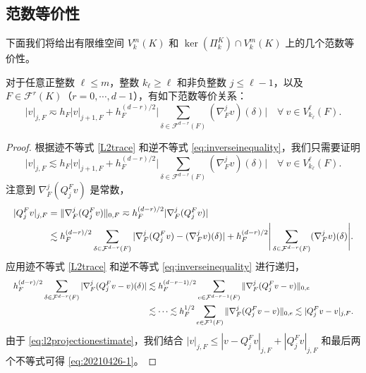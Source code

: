\subsection{范数等价性}
下面我们将给出有限维空间 
$V_{k}^{m}(K)$ 和 $\ker(\Pi_k^K)\cap V_{k}^{m}(K)$ 上的几个范数等价性。

\begin{lemma}
对于任意正整数 $\ell\leq m$，整数 $k_{\ell}\geq\ell$ 和非负整数 $j\leq \ell-1$，以及 $F\in\mathcal F^r(K)$（$r=0,\cdots, d-1$），有如下范数等价关系：
\begin{equation}\label{eq:normequivalencevertices}
|v|_{j,F}\eqsim h_F|v|_{j+1,F} + h_F^{(d-r)/2}\Bigg|\sum_{\delta\in\mathcal F^{d-r}(F)}(\nabla_F^{j}v)(\delta)\Bigg| \quad\forall~v\in V_{k_{\ell}}^{\ell}(F).
\end{equation}
\end{lemma}
\begin{proof}
根据迹不等式 \eqref{L2trace} 和逆不等式 \eqref{eq:inverseinequality}，我们只需要证明
\begin{equation}\label{eq:20210426-1}
|v|_{j,F}\lesssim h_F|v|_{j+1,F} + h_F^{(d-r)/2}\Bigg|\sum_{\delta\in\mathcal F^{d-r}(F)}(\nabla_F^{j}v)(\delta)\Bigg| \quad\forall~v\in V_{k_{\ell}}^{\ell}(F).
\end{equation}
注意到 $\nabla_F^j(Q_j^Fv)$ 是常数，
$$
\resizebox{\textwidth}{!}{$\displaystyle
\begin{aligned}
|Q_j^Fv|_{j,F}&=\|\nabla_F^j(Q_j^Fv)\|_{0,F}\eqsim  h_F^{(d-r)/2}|\nabla_F^j(Q_j^Fv)| \\
&\lesssim h_F^{(d-r)/2}\sum_{\delta\in\mathcal F^{d-r}(F)}|\nabla_F^j(Q_j^Fv) - (\nabla_F^{j}v)(\delta)|  +h_F^{(d-r)/2}\Bigg|\sum_{\delta\in\mathcal F^{d-r}(F)}(\nabla_F^{j}v)(\delta)\Bigg|.
\end{aligned}
$}
$$
应用迹不等式 \eqref{L2trace} 和逆不等式 \eqref{eq:inverseinequality} 进行递归，
$$
\resizebox{\textwidth}{!}{$\displaystyle
\begin{aligned}
h_F^{(d-r)/2}\sum_{\delta\in\mathcal F^{d-r}(F)}|\nabla_F^j(Q_j^Fv-v)(\delta)|
&\lesssim h_F^{(d-r-1)/2}\sum_{e\in\mathcal F^{d-r-1}(F)}\|\nabla_F^j(Q_j^Fv-v)\|_{0,e} \\
&\lesssim \cdots\lesssim h_F^{1/2}\sum_{e\in\mathcal F^{1}(F)}\|\nabla_F^j(Q_j^Fv-v)\|_{0,e}\lesssim |Q_j^Fv-v|_{j,F}. %
\end{aligned}
$}
$$
由于 \eqref{eq:l2projectionestimate}，我们结合 
$|v|_{j,F}\leq |v-Q_j^Fv|_{j,F}+|Q_j^Fv|_{j,F}$ 和最后两个不等式可得 
\eqref{eq:20210426-1}。
\end{proof}

